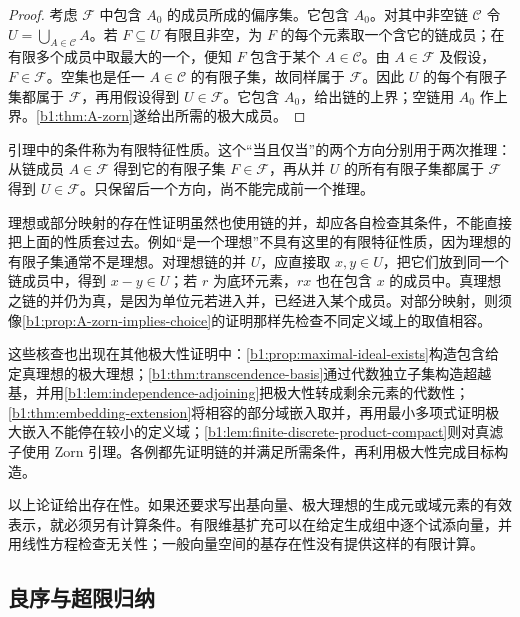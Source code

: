 \begin{proof}
	考虑 \(\mathscr F\) 中包含 \(A_0\) 的成员所成的偏序集。它包含 \(A_0\)。对其中非空链 \(\mathcal C\) 令 \(U=\bigcup_{A\in\mathcal C}A\)。若 \(F\subseteq U\) 有限且非空，为 \(F\) 的每个元素取一个含它的链成员；在有限多个成员中取最大的一个，便知 \(F\) 包含于某个 \(A\in\mathcal C\)。由 \(A\in\mathscr F\) 及假设，\(F\in\mathscr F\)。空集也是任一 \(A\in\mathcal C\) 的有限子集，故同样属于 \(\mathscr F\)。因此 \(U\) 的每个有限子集都属于 \(\mathscr F\)，再用假设得到 \(U\in\mathscr F\)。它包含 \(A_0\)，给出链的上界；空链用 \(A_0\) 作上界。\cref{b1:thm:A-zorn}遂给出所需的极大成员。
\end{proof}

引理中的条件称为有限特征性质。这个“当且仅当”的两个方向分别用于两次推理：从链成员 \(A\in\mathscr F\) 得到它的有限子集 \(F\in\mathscr F\)，再从并 \(U\) 的所有有限子集都属于 \(\mathscr F\) 得到 \(U\in\mathscr F\)。只保留后一个方向，尚不能完成前一个推理。

\ProseParagraphBreak
理想或部分映射的存在性证明虽然也使用链的并，却应各自检查其条件，不能直接把上面的性质套过去。例如“是一个理想”不具有这里的有限特征性质，因为理想的有限子集通常不是理想。对理想链的并 \(U\)，应直接取 \(x,y\in U\)，把它们放到同一个链成员中，得到 \(x-y\in U\)；若 \(r\) 为底环元素，\(rx\) 也在包含 \(x\) 的成员中。真理想之链的并仍为真，是因为单位元若进入并，已经进入某个成员。对部分映射，则须像\cref{b1:prop:A-zorn-implies-choice}的证明那样先检查不同定义域上的取值相容。

\ProseParagraphBreak
这些核查也出现在其他极大性证明中：\cref{b1:prop:maximal-ideal-exists}构造包含给定真理想的极大理想；\cref{b1:thm:transcendence-basis}通过代数独立子集构造超越基，并用\cref{b1:lem:independence-adjoining}把极大性转成剩余元素的代数性；\cref{b1:thm:embedding-extension}将相容的部分域嵌入取并，再用最小多项式证明极大嵌入不能停在较小的定义域；\cref{b1:lem:finite-discrete-product-compact}则对真滤子使用 Zorn 引理。各例都先证明链的并满足所需条件，再利用极大性完成目标构造。

\ProseParagraphBreak
以上论证给出存在性。如果还要求写出基向量、极大理想的生成元或域元素的有效表示，就必须另有计算条件。有限维基扩充可以在给定生成组中逐个试添向量，并用线性方程检查无关性；一般向量空间的基存在性没有提供这样的有限计算。

\subsection{良序与超限归纳}
\label{b1:subsec:A01:03}

